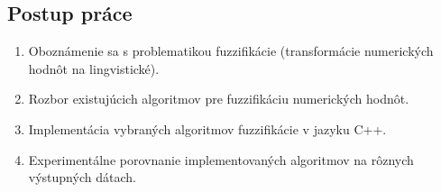 \subsection*{Postup práce }
\begin{enumerate}
\item Oboznámenie sa s problematikou fuzzifikácie (transformácie numerických hodnôt na lingvistické).
\item Rozbor existujúcich algoritmov pre fuzzifikáciu numerických hodnôt.
\item  Implementácia vybraných algoritmov fuzzifikácie v jazyku C++.
\item  Experimentálne porovnanie implementovaných algoritmov na rôznych výstupných dátach.
\end{enumerate}


















